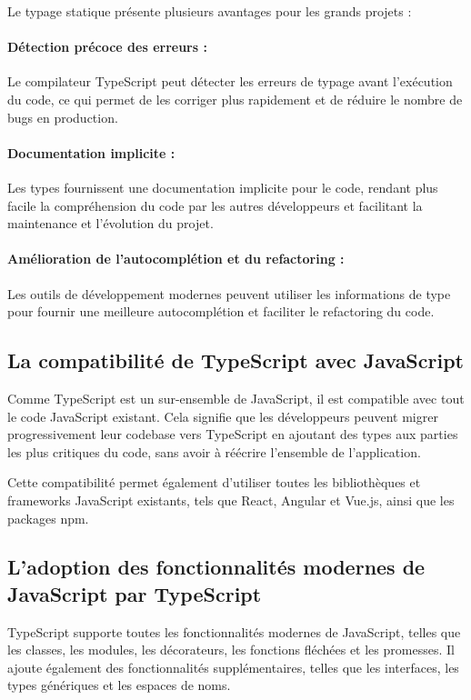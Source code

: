 Le typage statique présente plusieurs avantages pour les grands projets :

\paragraph{Détection précoce des erreurs :} Le compilateur TypeScript peut détecter les erreurs de typage avant l'exécution du code, ce qui permet de les corriger plus rapidement et de réduire le nombre de bugs en production.
\paragraph{Documentation implicite :} Les types fournissent une documentation implicite pour le code, rendant plus facile la compréhension du code par les autres développeurs et facilitant la maintenance et l'évolution du projet.
\paragraph{Amélioration de l'autocomplétion et du refactoring :} Les outils de développement modernes peuvent utiliser les informations de type pour fournir une meilleure autocomplétion et faciliter le refactoring du code.

\subsection{La compatibilité de TypeScript avec JavaScript}

Comme TypeScript est un sur-ensemble de JavaScript, il est compatible avec tout le code JavaScript existant. Cela signifie que les développeurs peuvent migrer progressivement leur codebase vers TypeScript en ajoutant des types aux parties les plus critiques du code, sans avoir à réécrire l'ensemble de l'application.

Cette compatibilité permet également d'utiliser toutes les bibliothèques et frameworks JavaScript existants, tels que React, Angular et Vue.js, ainsi que les packages npm.

\subsection{L'adoption des fonctionnalités modernes de JavaScript par TypeScript}

TypeScript supporte toutes les fonctionnalités modernes de JavaScript, telles que les classes, les modules, les décorateurs, les fonctions fléchées et les promesses. Il ajoute également des fonctionnalités supplémentaires, telles que les interfaces, les types génériques et les espaces de noms.

